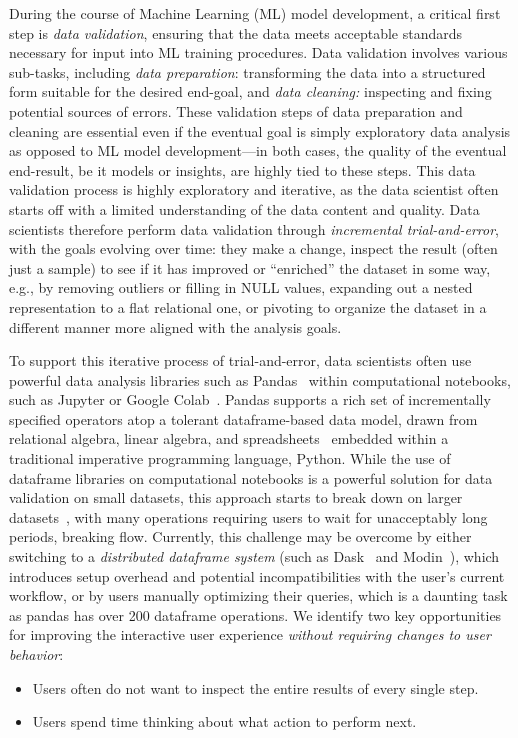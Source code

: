 

During the course of Machine Learning (ML) model development,
a critical first step is {\em data validation},
ensuring that the data meets acceptable standards
necessary for input into ML training procedures.
Data validation involves various sub-tasks,
including 
{\em data preparation}:
transforming the data into a structured 
form suitable for the desired end-goal,
and  
{\em data cleaning:}
inspecting and fixing potential sources of errors.
These validation steps of data preparation and cleaning
are essential even if the eventual goal
is simply exploratory data analysis
as opposed to ML model development---in both
cases, the quality of the eventual
end-result, be it models or insights,
are highly tied to these steps.
This data validation process is highly exploratory and iterative, 
as the data scientist often 
starts off with a limited understanding 
of the data content and quality.
Data scientists therefore 
perform data validation through {\em incremental trial-and-error},
with the goals evolving over time: 
they make a change,
inspect the result (often just a sample) 
to see if it has improved or ``enriched'' 
the dataset in some way,
e.g., by removing outliers or filling in NULL values, 
expanding out a nested representation
to a flat relational one, or pivoting to organize
the dataset in a different manner 
more aligned with the analysis
goals.



To support this iterative process of trial-and-error,
data scientists often use powerful data analysis
libraries such as Pandas~\cite{pandas-api} within computational notebooks,
such as Jupyter or Google Colab~\cite{kluyver2016jupyter, colab}.
Pandas supports a rich set of incrementally specified 
operators atop a tolerant
dataframe-based data model, drawn from relational algebra,
linear algebra, and spreadsheets~\cite{petersohn13towards} 
embedded within a traditional imperative programming language, Python. 
While the use of dataframe libraries on computational notebooks
is a powerful solution for data validation on small datasets, 
this approach starts to break down on larger datasets~\cite{petersohn13towards}, with many operations requiring users to wait for
unacceptably long periods, breaking flow. 
Currently, this challenge may be overcome by either switching to a \emph{distributed dataframe system} (such as Dask~\cite{Dask} and Modin~\cite{Modin}), which introduces setup overhead and potential incompatibilities with the user's current workflow, or by users manually optimizing their queries, which is a daunting task as pandas has over 200 dataframe operations.
We identify two key opportunities for improving the interactive
user experience \textit{without requiring changes to user behavior}: 
\begin{itemize}
	\item Users often do not want to inspect the entire results of every single step.
	\item Users spend time thinking about what action to perform next. 
\end{itemize}

